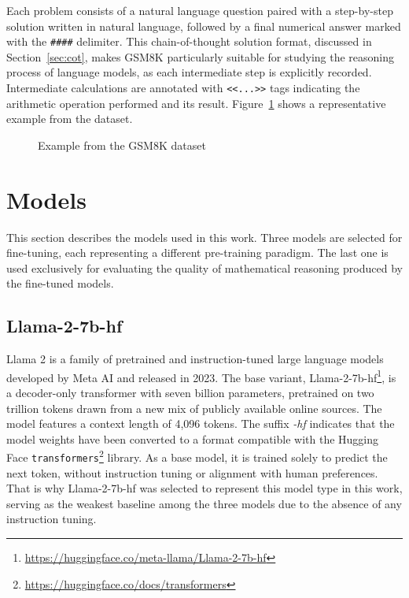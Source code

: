  Each problem consists of a natural language question paired with a
  step-by-step solution written in natural language, followed by a
  final numerical answer marked with the \texttt{\#\#\#\#} delimiter. This
  chain-of-thought solution format, discussed in Section~\ref{sec:cot}, makes GSM8K
  particularly suitable for
  studying the reasoning process of language models, as each
  intermediate step is explicitly recorded. Intermediate
  calculations are annotated with \texttt{<<...>>} tags indicating
  the arithmetic operation performed and its result.
  Figure~\ref{fig:gsm8k-example} shows a representative example from the dataset.

  \begin{figure}[ht]
  \centering
  \caption{Example from the GSM8K dataset}
  \label{fig:gsm8k-example}
  \end{figure}

\section{Models}
\label{sec:models}

This section describes the models used in this work. Three models
  are selected for fine-tuning, each representing a different
  pre-training paradigm. The last one is used exclusively for
  evaluating the quality of mathematical reasoning produced by the fine-tuned models.

\subsection*{Llama-2-7b-hf}

  Llama 2 \cite{touvron2023} is a family of pretrained and instruction-tuned large
  language models developed by Meta AI and released in 2023. The base variant,
  Llama-2-7b-hf\footnote{\url{https://huggingface.co/meta-llama/Llama-2-7b-hf}}, is a
  decoder-only transformer with seven billion parameters, pretrained
  on two trillion tokens drawn from a new mix of publicly available
  online sources. The model features a context length of 4,096
  tokens.
  The suffix \textit{-hf} indicates that the model weights have
  been converted to a format compatible with the Hugging Face
  \texttt{transformers}\footnote{\url{https://huggingface.co/docs/transformers}} library.
  As a base model, it is trained
  solely to predict the next token, without instruction tuning or
  alignment with human preferences. That is why Llama-2-7b-hf was selected to
  represent this model type in this work,
  serving as the weakest baseline among the
  three models due to the absence of any
  instruction tuning.
